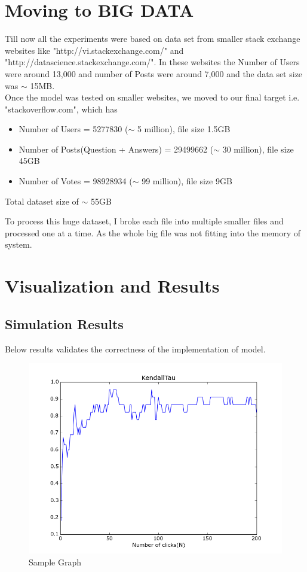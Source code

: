 \documentclass{article}
\begin{document}
\section{Moving to BIG DATA}
Till now all the experiments were based on data set from smaller stack exchange
websites like "http://vi.stackexchange.com/" and "http://datascience.stackexchange.com/".
In these websites the Number of Users were around 13,000 and number of Posts were
around 7,000 and the data set size was $\sim$ 15MB.\\

Once the model was tested on smaller websites, we moved to our final target i.e.
"stackoverflow.com", which has \\
\begin{itemize}
    \item Number of Users = 5277830 ($\sim$ 5 million), file size 1.5GB
    \item Number of Posts(Question + Answers) = 29499662 ($\sim$ 30 million), file size 45GB
    \item Number of Votes = 98928934 ($\sim$ 99 million), file size 9GB
\end{itemize}
Total dataset size of $\sim$ 55GB

To process this huge dataset, I broke each file into multiple smaller files and 
processed one at a time. As the whole big file was not fitting into the memory of 
system.\\
\section{Visualization and Results}
\subsection{Simulation Results}
Below results validates the correctness of the implementation of model.\\
\begin{figure}[h]
\centering
\includegraphics[width=12cm]{results_ver2/KTau-User.png}
\caption{Sample Graph}
\label{fig1:overview}
\end{figure}
\end{document}
